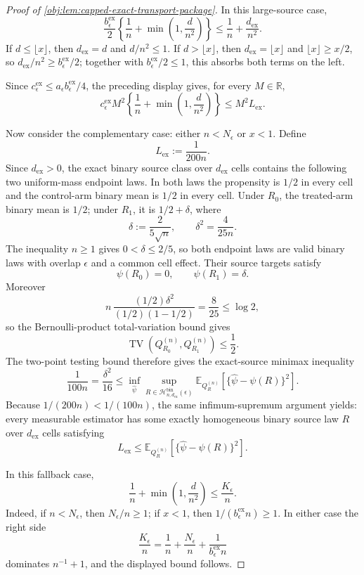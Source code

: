 \begin{proof}[Proof of \cref{obj:lem:capped-exact-transport-package}]
In this large-source case,
\[
\frac{b_{\epsilon}^{\mathrm{ex}}}{2}
\left\{\frac1n+\min\left(1,\frac d{n^2}\right)\right\}
\le
\frac1n+\frac{d_{\mathrm{ex}}}{n^2}.
\]
If \(d\le\lfloor x\rfloor\), then \(d_{\mathrm{ex}}=d\) and \(d/n^2\le1\).  If \(d>\lfloor x\rfloor\), then \(d_{\mathrm{ex}}=\lfloor x\rfloor\) and \(\lfloor x\rfloor\ge x/2\), so \(d_{\mathrm{ex}}/n^2\ge b_{\epsilon}^{\mathrm{ex}}/2\); together with \(b_{\epsilon}^{\mathrm{ex}}/2\le1\), this absorbs both terms on the left. %

Since \(c_{\epsilon}^{\mathrm{ex}}\le a_\epsilon b_{\epsilon}^{\mathrm{ex}}/4\), the preceding display gives, for every \(M\in\mathbb R\),
\[
c_{\epsilon}^{\mathrm{ex}}M^2
\left\{\frac1n+\min\left(1,\frac d{n^2}\right)\right\}
\le
M^2L_{\mathrm{ex}} .
\]

Now consider the complementary case: either \(n<N_\epsilon\) or \(x<1\).  Define
\[
L_{\mathrm{ex}}:=\frac1{200n}.
\]
Since \(d_{\mathrm{ex}}>0\), the exact binary source class over \(d_{\mathrm{ex}}\) cells contains the following two uniform-mass endpoint laws.  In both laws the propensity is \(1/2\) in every cell and the control-arm binary mean is \(1/2\) in every cell.  Under \(R_0\), the treated-arm binary mean is \(1/2\); under \(R_1\), it is \(1/2+\delta\), where
\[
\delta:=\frac{2}{5\sqrt n},
\qquad
\delta^2=\frac{4}{25n}.
\]
The inequality \(n\ge1\) gives \(0<\delta\le2/5\), so both endpoint laws are valid binary laws with overlap \(\epsilon\) and a common cell effect.  Their source targets satisfy
\[
\psi(R_0)=0,
\qquad
\psi(R_1)=\delta .
\]
Moreover
\[
n\,\frac{(1/2)\delta^2}{(1/2)(1-1/2)}
=
\frac{8}{25}
\le \log 2,
\]
so the Bernoulli-product total-variation bound gives
\[
\operatorname{TV}\!\left(Q_{R_0}^{(n)},Q_{R_1}^{(n)}\right)\le\frac12 .
\]
The two-point testing bound therefore gives the exact-source minimax inequality
\[
\frac1{100n}
=
\frac{\delta^2}{16}
\le
\inf_{\widehat\psi}
\sup_{R\in\mathcal H_{n,d_{\mathrm{ex}}}^{\mathrm{bin}}(\epsilon)}
\mathbb E_{Q_R^{(n)}}\!\left[
\{\widehat\psi-\psi(R)\}^2
\right].
\]
Because \(1/(200n)<1/(100n)\), the same infimum-supremum argument yields: every measurable estimator has some exactly homogeneous binary source law \(R\) over \(d_{\mathrm{ex}}\) cells satisfying
\[
L_{\mathrm{ex}}
\le
\mathbb E_{Q_R^{(n)}}\!\left[
\{\widehat\psi-\psi(R)\}^2
\right].
\]

In this fallback case,
\[
\frac1n+\min\left(1,\frac d{n^2}\right)
\le
\frac{K_\epsilon}{n}.
\]
Indeed, if \(n<N_\epsilon\), then \(N_\epsilon/n\ge1\); if \(x<1\), then \(1/(b_{\epsilon}^{\mathrm{ex}}n)\ge1\).  In either case the right side
\[
\frac{K_\epsilon}{n}
=
\frac1n+\frac{N_\epsilon}{n}
+\frac1{b_{\epsilon}^{\mathrm{ex}}n}
\]
dominates \(n^{-1}+1\), and the displayed bound follows. %


\end{proof}
